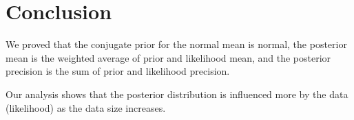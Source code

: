 \section{Conclusion}

We proved that the conjugate prior for the normal mean is normal, the posterior mean is the weighted average of prior and likelihood mean, and the posterior precision is the sum of prior and likelihood precision.

Our analysis shows that the posterior distribution is influenced more by the data (likelihood) as the data size increases.
